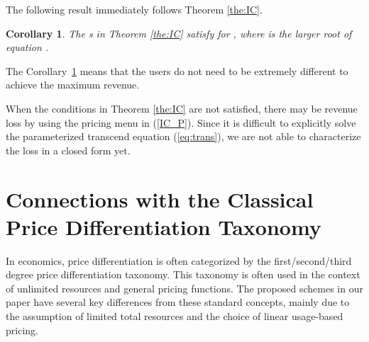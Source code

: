 \documentclass[twocolumn,10pt,twosided]{IEEEtran}
\newtheorem{corollary}{Corollary}
\begin{document}
The following result immediately follows Theorem \ref{the:IC}.
\begin{corollary}
\label{cor:icn}
The s in Theorem \ref{the:IC} satisfy
 for , where  is the larger root of equation .
\end{corollary}

The Corollary~\ref{cor:icn} means that the users do not need to be extremely different to achieve the maximum revenue.



When the conditions in Theorem \ref{the:IC} are not satisfied, there
may be revenue loss by using the pricing menu in (\ref{IC_P}). Since it is difficult to explicitly solve the parameterized transcend equation
(\ref{eq:trans}), we are not able to characterize the loss in a closed form yet.



\section{Connections with the Classical Price Differentiation Taxonomy}

In economics, price differentiation is often categorized by the first/second/third degree price differentiation taxonomy\cite{pashigian1995price}. This taxonomy is often used in the context of unlimited resources and general pricing functions. The proposed schemes in our paper have several key differences from these standard concepts, mainly due to the assumption of limited total resources and the choice of linear usage-based pricing.
\end{document}
